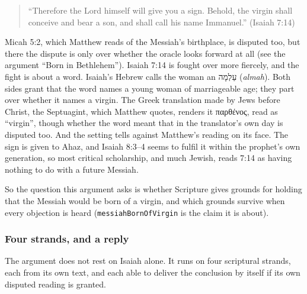 \documentclass[11pt]{article}
\begin{document}
\begin{quote}
“Therefore the Lord himself will give you a sign. Behold, the virgin shall conceive and bear a son, and shall call his name Immanuel.” (Isaiah 7:14)

\end{quote}
Micah 5:2, which Matthew reads of the Messiah’s birthplace, is disputed too, but there the dispute is only over whether the oracle looks forward at all (see the argument “Born in Bethlehem”). Isaiah 7:14 is fought over more fiercely, and the fight is about a word. Isaiah’s Hebrew calls the woman an עַלְמָה (\emph{almah}). Both sides grant that the word names a young woman of marriageable age; they part over whether it names a virgin. The Greek translation made by Jews before Christ, the Septuagint, which Matthew quotes, renders it παρθένος, read as “virgin”, though whether the word meant that in the translator’s own day is disputed too. And the setting tells against Matthew’s reading on its face. The sign is given to Ahaz, and Isaiah 8:3–4 seems to fulfil it within the prophet’s own generation, so most critical scholarship, and much Jewish, reads 7:14 as having nothing to do with a future Messiah.

So the question this argument asks is whether Scripture gives grounds for holding that the Messiah would be born of a virgin, and which grounds survive when every objection is heard (\texttt{messiah\allowbreak{}Born\allowbreak{}Of\allowbreak{}Virgin} is the claim it is about).

\subsubsection*{Four strands, and a reply}
The argument does not rest on Isaiah alone. It runs on four scriptural strands, each from its own text, and each able to deliver the conclusion by itself if its own disputed reading is granted.
\end{document}
